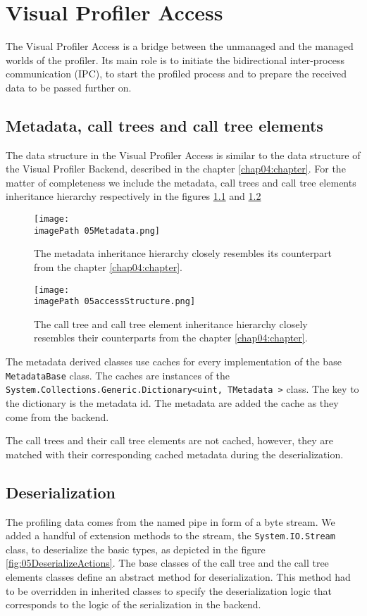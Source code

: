\chapter{Visual Profiler Access}
The Visual Profiler Access is a bridge between the unmanaged and the managed worlds of the profiler. Its main role is to initiate the bidirectional inter-process communication (IPC), to start the profiled process and to prepare the received data to be passed further on.

\section{Metadata, call trees and call tree elements}
The data structure in the Visual Profiler Access is similar to the data structure of the Visual Profiler Backend, described in the chapter \ref{chap04:chapter}. For the matter of completeness we include the metadata, call trees and call tree elements inheritance hierarchy respectively in the figures \ref{fig:05Metadata} and \ref{fig:05accessStructure}

\begin{figure}
	\centering
		\texttt{[image: \\imagePath 05Metadata.png]}
		\caption{The metadata inheritance hierarchy closely resembles its counterpart from the chapter \ref{chap04:chapter}.}
	\label{fig:05Metadata}
\end{figure}

\begin{figure}
	\centering
		\texttt{[image: \\imagePath 05accessStructure.png]}
		\caption{The call tree and call tree element inheritance hierarchy closely resembles their counterparts from the chapter \ref{chap04:chapter}.}
	\label{fig:05accessStructure}
\end{figure}

The metadata derived classes use caches for every implementation of the base \texttt{MetadataBase} class. The caches are instances of the \texttt{System.Collections.Generic.Dictionary\textless uint, TMetadata \textgreater} class. The key to the dictionary is the metadata id. The metadata are added the cache as they come from the backend.

The call trees and their call tree elements are not cached, however, they are matched with their corresponding cached metadata during the deserialization.

\section{Deserialization}
The profiling data comes from the named pipe in form of a byte stream. We added a handful of extension methods to the stream, the \texttt{System.IO.Stream} class, to deserialize the basic types, as depicted in the figure \ref{fig:05DeserializeActions}. The base classes of the call tree and the call tree elements classes define an abstract method for deserialization. This method had to be overridden in inherited classes to specify the deserialization logic that corresponds to the logic of the serialization in the backend.

